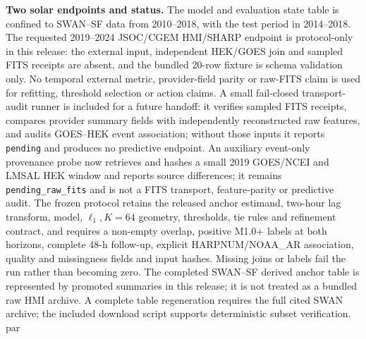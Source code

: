 \documentclass[11pt,a4paper]{article}
\numberwithin{equation}{section}
\theoremstyle{definition}\newtheorem{definition}[theorem]{Definition}
\theoremstyle{remark}\newtheorem{remark}[theorem]{Remark}
\begin{document}
\textbf{Two solar endpoints and status.} The model and evaluation state table is confined to SWAN--SF data from 2010--2018, with the test period in 2014--2018. The requested 2019--2024 JSOC/CGEM HMI/SHARP endpoint is protocol-only in this release: the external input, independent HEK/GOES join and sampled FITS receipts are absent, and the bundled 20-row fixture is schema validation only. No temporal external metric, provider-field parity or raw-FITS claim is used for refitting, threshold selection or action claims. A small fail-closed transport-audit runner is included for a future handoff: it verifies sampled FITS receipts, compares provider summary fields with independently reconstructed raw features, and audits GOES--HEK event association; without those inputs it reports \texttt{pending} and produces no predictive endpoint. An auxiliary event-only provenance probe now retrieves and hashes a small 2019 GOES/NCEI and LMSAL HEK window and reports source differences; it remains \texttt{pending\_raw\_fits} and is not a FITS transport, feature-parity or predictive audit. The frozen protocol retains the released anchor estimand, two-hour lag transform, model, $\ell_1,K=64$ geometry, thresholds, tie rules and refinement contract, and requires a non-empty overlap, positive M1.0+ labels at both horizons, complete 48-h follow-up, explicit HARPNUM/NOAA\_AR association, quality and missingness fields and input hashes. Missing joins or labels fail the run rather than becoming zero. The completed SWAN--SF derived anchor table is represented by promoted summaries in this release; it is not treated as a bundled raw HMI archive. A complete table regeneration requires the full cited SWAN archive; the included download script supports deterministic subset verification.\\par
\end{document}
